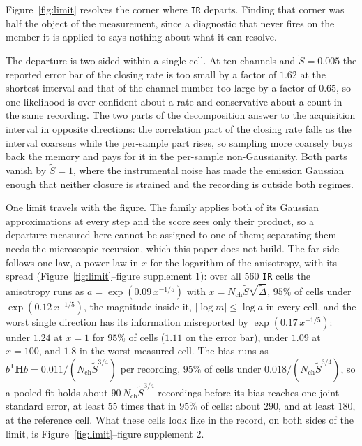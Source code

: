 \begin{figure}[htbp]
\end{figure}


Figure~\ref{fig:limit} resolves the corner where \texttt{IR} departs. Finding that corner was half the object of the measurement, since
a diagnostic that never fires on the member it is applied to says nothing about what it can resolve.

The departure is two-sided within a single cell. At ten channels and $\widetilde{S} = 0.005$ the
reported error bar of the closing rate is too small by a factor of $1.62$ at the shortest interval
and that of the channel number too large by a factor of $0.65$, so one likelihood is over-confident
about a rate and conservative about a count in the same recording. %
The two parts of the decomposition answer to the acquisition interval in opposite directions: the
correlation part of the closing rate falls as the interval coarsens while the per-sample part rises,
so sampling more coarsely buys back the memory and pays for it in the per-sample non-Gaussianity. %
Both parts vanish by $\widetilde{S} = 1$,
where the instrumental noise has made the emission Gaussian enough that neither closure is strained
and the recording is outside both regimes. %

One limit travels with the figure. The family applies both of its Gaussian approximations at every
step and the score sees only their product, so a departure measured here cannot be assigned to one of
them; separating them needs the microscopic recursion, which this paper does not build. The far side follows one law, a power law in $x$ for the logarithm of the anisotropy, with its spread (Figure~\ref{fig:limit}--figure supplement 1): over all
$560$ \texttt{IR} cells the anisotropy runs as $a = \exp(0.09\,x^{-1/5})$ with
$x = N_{\mathrm{ch}}\widetilde{S}\sqrt{\widetilde{\Delta}}$, $95\%$ of cells under $\exp(0.12\,x^{-1/5})$, the
magnitude inside it, $|\log m| \le \log a$ in every cell, and the worst single direction has its information
misreported by $\exp(0.17\,x^{-1/5})$: under $1.24$ at $x = 1$ for $95\%$ of cells ($1.11$ on the error bar),
under $1.09$ at $x = 100$, and $1.8$ in the worst measured cell. The bias runs as
$b^{\mathsf{T}}\mathbf{H}b = 0.011/(N_{\mathrm{ch}}\widetilde{S}^{3/4})$ per recording, $95\%$ of cells under
$0.018/(N_{\mathrm{ch}}\widetilde{S}^{3/4})$, so a pooled fit holds about $90\,N_{\mathrm{ch}}\widetilde{S}^{3/4}$
recordings before its bias reaches one joint standard error, at least $55$ times that in $95\%$ of cells: about
$290$, and at least $180$, at the reference cell. What these cells look like in the record, on both sides of the limit, is Figure~\ref{fig:limit}--figure supplement 2. %

